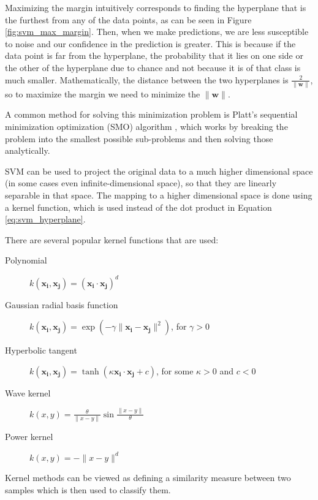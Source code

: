 Maximizing the margin intuitively corresponds to finding the hyperplane that is the furthest from any of the data points, as can be seen in Figure \ref{fig:svm_max_margin}. Then, when we make predictions, we are less susceptible to noise and our confidence in the prediction is greater. This is because if the data point is far from the hyperplane, the probability that it lies on one side or the other of the hyperplane due to chance and not because it is of that class is much smaller. Mathematically, the distance between the two hyperplanes is $ \tfrac{2}{\|\mathbf{w}\|} $, so to maximize the margin we need to minimize the $ \| \mathbf{w} \| $. 

A common method for solving this minimization problem is Platt's sequential minimization optimization (SMO) algorithm \cite{platt1998sequential}, which works by breaking the problem into the smallest possible sub-problems and then solving those analytically. 

SVM can be used to project the original data to a much higher dimensional space (in some cases even infinite-dimensional space), so that they are linearly separable in that space. The mapping to a higher dimensional space is done using a kernel function, which is used instead of the dot product in Equation \eqref{eq:svm_hyperplane}.

There are several popular kernel functions that are used: 
\begin{description}
\item[Polynomial] $ k(\mathbf{x_i},\mathbf{x_j})=(\mathbf{x_i} \cdot \mathbf{x_j})^d$ \cite{goldberg2008splitsvm}
\item[Gaussian radial basis function] $ k(\mathbf{x_i},\mathbf{x_j})=\exp(-\gamma \|\mathbf{x_i} - \mathbf{x_j}\|^2)$, for $ \gamma > 0 $ \cite{Chang:2010:TTL:1756006.1859899}
\item[Hyperbolic tangent] $ k(\mathbf{x_i},\mathbf{x_j})=\tanh(\kappa \mathbf{x_i} \cdot \mathbf{x_j}+c) $, for some $ \kappa > 0 $ and $ c < 0 $ \cite{sellathurai1999separability}
\item[Wave kernel] $ k(x, y) = \frac{\theta}{\| x-y \| } \sin \frac{\| x-y \| }{\theta} $ 
\item[Power kernel] $ k(x,y) = - \lVert x-y \rVert ^d $ \cite{fleuret2003scale}
\end{description}

Kernel methods can be viewed as defining a similarity measure between two samples which is then used to classify them. \cite{Vert}

